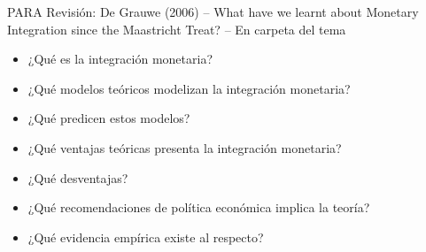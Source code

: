 \documentclass{nuevotema}
\begin{document}
\ideaclave

PARA Revisión: De Grauwe (2006) -- What have we learnt about Monetary Integration since the Maastricht Treat? -- En carpeta del tema

\begin{itemize}
	\item ¿Qué es la integración monetaria?
	\item ¿Qué modelos teóricos modelizan la integración monetaria?
	\item ¿Qué predicen estos modelos?
	\item ¿Qué ventajas teóricas presenta la integración monetaria?
	\item ¿Qué desventajas?
	\item ¿Qué recomendaciones de política económica implica la teoría?
	\item ¿Qué evidencia empírica existe al respecto?
\end{itemize}

\esquemacorto
\end{document}
